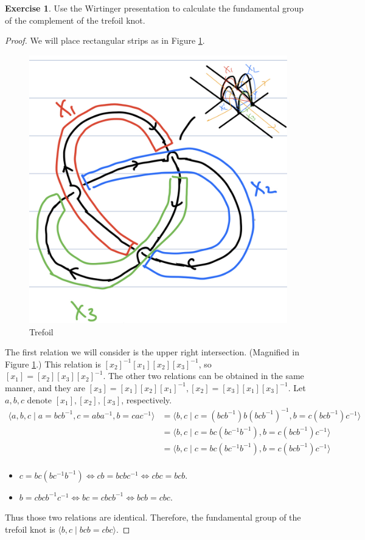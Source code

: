 \documentclass[12pt, psamsfonts]{amsart}
\theoremstyle{definition}
\newtheorem*{exer}{Exercise}
\theoremstyle{remark}
\numberwithin{equation}{section}
\begin{document}
\begin{exer}
  Use the Wirtinger presentation to calculate the fundamental group of the complement of the trefoil knot.
\end{exer}

\begin{proof}
  We will place rectangular strips as in Figure \ref{fig:trefoil}.
  \begin{figure}
    \includegraphics[width=\linewidth]{trefoil.jpeg}
    \caption{Trefoil}
    \label{fig:trefoil}
  \end{figure}

  The first relation we will consider is the upper right intersection.
  (Magnified in Figure \ref{fig:trefoil}.)
  This relation is $[x_2]^{-1}[x_1][x_2][x_3]^{-1}$, so $[x_1] = [x_2][x_3][x_2]^{-1}$.
  The other two relations can be obtained in the same manner, and they are $[x_3] = [x_1][x_2][x_1]^{-1}, [x_2] = [x_3][x_1][x_3]^{-1}$.
  Let $a, b, c$ denote $[x_1], [x_2], [x_3]$, respectively.
  \begin{align*}
    \langle a, b, c \mid a = bcb^{-1}, c = aba^{-1}, b = cac^{-1} \rangle
      &= \langle b, c \mid c = (bcb^{-1})b(bcb^{-1})^{-1}, b = c(bcb^{-1})c^{-1} \rangle \\
      &= \langle b, c \mid c = bc(bc^{-1}b^{-1}), b = c(bcb^{-1})c^{-1} \rangle \\
      &= \langle b, c \mid c = bc(bc^{-1}b^{-1}), b = c(bcb^{-1})c^{-1} \rangle \\
  \end{align*}
  \begin{itemize}
    \item
      $c = bc(bc^{-1}b^{-1}) \iff cb = bcbc^{-1} \iff cbc = bcb$.
    \item
      $b = cbcb^{-1}c^{-1} \iff bc = cbcb^{-1} \iff bcb = cbc$.
  \end{itemize}
  Thus those two relations are identical.
  Therefore, the fundamental group of the trefoil knot is $\langle b, c \mid bcb = cbc \rangle$.


\end{proof}
\end{document}
